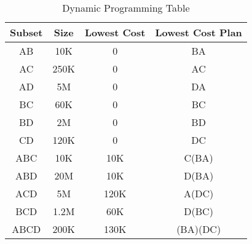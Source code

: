 \documentclass[paper=a4, fontsize=11pt]{scrartcl}
\numberwithin{equation}{section}		%
\numberwithin{figure}{section}			%
\numberwithin{table}{section}				%
\begin{document}
	\begin{table}[ht]
		\centering
		\label{Table1}
		\begin{tabular}{|c|c|c|c|}
			\hline
			\textbf{Subset} & \textbf{Size} & \textbf{Lowest Cost} & \textbf{Lowest Cost Plan} \\ \hline
			AB              & 10K           & 0                    & BA                        \\ \hline
			AC              & 250K          & 0                    & AC                        \\ \hline
			AD              & 5M            & 0                    & DA                        \\ \hline
			BC              & 60K           & 0                    & BC                        \\ \hline
			BD              & 2M            & 0                    & BD                        \\ \hline
			CD              & 120K          & 0                    & DC                        \\ \hline
			ABC             & 10K           & 10K                  & C(BA)                     \\ \hline
			ABD             & 20M           & 10K                  & D(BA)                     \\ \hline
			ACD             & 5M            & 120K                 & A(DC)                     \\ \hline
			BCD             & 1.2M          & 60K                  & D(BC)                     \\ \hline
			ABCD            & 200K          & 130K                 & (BA)(DC)                  \\ \hline
		\end{tabular}
		\caption{Dynamic Programming Table}
	\end{table}
	
	
\end{document}
